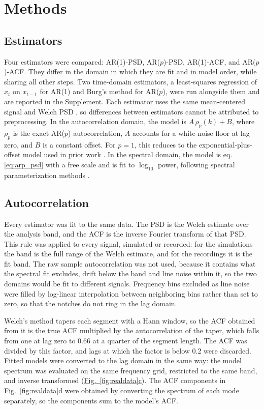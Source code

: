 \documentclass[pdflatex,lineno,sn-nature]{sn-jnl}
\newcommand{\figpanel}[3][]{\hyperref[#2]{Fig.~#1\ref*{#2}#3}}
\theoremstyle{thmstyleone}
\theoremstyle{thmstyletwo}
\theoremstyle{thmstylethree}
\begin{document}
\section{Methods}\label{sec:methods}

\subsection{Estimators}

Four estimators were compared: AR(1)-PSD, AR($p$)-PSD, AR(1)-ACF, and AR($p$)-ACF. They differ in the domain in which they are fit and in model order, while sharing all other steps. Two time-domain estimators, a least-squares regression of $x_t$ on $x_{t-1}$ for AR(1) and Burg's method \cite{burg_maximum_1975} for AR($p$), were run alongside them and are reported in the Supplement. Each estimator uses the same mean-centered signal and Welch PSD \cite{welch_use_1967}, so differences between estimators cannot be attributed to preprocessing. In the autocorrelation domain, the model is $A\,\rho_p(k) + B$, where $\rho_p$ is the exact AR($p$) autocorrelation, $A$ accounts for a white-noise floor at lag zero, and $B$ is a constant offset. For $p=1$, this reduces to the exponential-plus-offset model used in prior work \cite{murray_hierarchy_2014}. In the spectral domain, the model is eq. \ref{eq:arp_psd} with a free scale and is fit to $\log_{10}$ power, following spectral parameterization methods \cite{donoghue_parameterizing_2020}.

\subsection{Autocorrelation}

Every estimator was fit to the same data. The PSD is the Welch estimate over the analysis band, and the ACF is the inverse Fourier transform of that PSD. This rule was applied to every signal, simulated or recorded: for the simulations the band is the full range of the Welch estimate, and for the recordings it is the fit band. The raw sample autocorrelation was not used, because it contains what the spectral fit excludes, drift below the band and line noise within it, so the two domains would be fit to different signals. Frequency bins excluded as line noise were filled by log-linear interpolation between neighboring bins rather than set to zero, so that the notches do not ring in the lag domain.

Welch's method tapers each segment with a Hann window, so the ACF obtained from it is the true ACF multiplied by the autocorrelation of the taper, which falls from one at lag zero to 0.66 at a quarter of the segment length. The ACF was divided by this factor, and lags at which the factor is below 0.2 were discarded. Fitted models were converted to the lag domain in the same way: the model spectrum was evaluated on the same frequency grid, restricted to the same band, and inverse transformed (\figpanel{fig:realdata}{c}). The ACF components in \figpanel{fig:realdata}{d} were obtained by converting the spectrum of each mode separately, so the components sum to the model's ACF.
\end{document}
